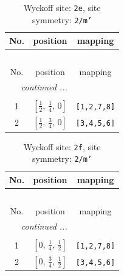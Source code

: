 \documentclass[fleqn,8pt]{jsarticle}
\begin{document}
\begin{longtable}{ccc}
\caption{Wyckoff site: {\tt 2e}, site symmetry: {\tt 2/m'}}
 \\
 \hline \hline
No. & position & mapping \\ \hline \endfirsthead

\multicolumn{2}{l}{\tablename\ \thetable{}} \\
 \hline \hline
No. & position & mapping \\ \hline \endhead

 \hline \hline
\multicolumn{2}{r}{\footnotesize\it continued ...} \\ \endfoot

 \hline \hline
\multicolumn{2}{r}{} \\ \endlastfoot

1 & $\left[ \frac{1}{2},\, \frac{1}{4},\, 0 \right]$ & {\tt [1,2,7,8]} \\ \hline
2 & $\left[ \frac{1}{2},\, \frac{3}{4},\, 0 \right]$ & {\tt [3,4,5,6]} \\
\end{longtable}
\renewcommand{\arraystretch}{1.2}
\begin{longtable}{ccc}
\caption{Wyckoff site: {\tt 2f}, site symmetry: {\tt 2/m'}}
 \\
 \hline \hline
No. & position & mapping \\ \hline \endfirsthead

\multicolumn{2}{l}{\tablename\ \thetable{}} \\
 \hline \hline
No. & position & mapping \\ \hline \endhead

 \hline \hline
\multicolumn{2}{r}{\footnotesize\it continued ...} \\ \endfoot

 \hline \hline
\multicolumn{2}{r}{} \\ \endlastfoot

1 & $\left[ 0,\, \frac{1}{4},\, \frac{1}{2} \right]$ & {\tt [1,2,7,8]} \\ \hline
2 & $\left[ 0,\, \frac{3}{4},\, \frac{1}{2} \right]$ & {\tt [3,4,5,6]} \\
\end{longtable}
\renewcommand{\arraystretch}{1.2}
\end{document}
